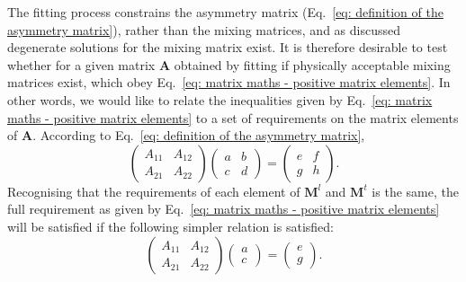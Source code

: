 The fitting process constrains the asymmetry matrix (Eq.~\eqref{eq: definition of the asymmetry matrix}), rather than the mixing matrices, and as discussed degenerate solutions for the mixing matrix exist. It is therefore desirable to test whether for a given matrix $\mathbf{A}$ obtained by fitting if physically acceptable mixing matrices exist, which obey Eq.~\eqref{eq: matrix maths - positive matrix elements}. In other words, we would like to relate the inequalities given by Eq.~\eqref{eq: matrix maths - positive matrix elements} to a set of requirements on the matrix elements of $\mathbf{A}$. According to Eq.~\eqref{eq: definition of the asymmetry matrix},
\begin{equation}
    \label{eq: constraints on the asymmetry matrix}
    \begin{pmatrix} A_{11}&A_{12}\\A_{21}&A_{22}\end{pmatrix}\begin{pmatrix} a&b\\c&d\end{pmatrix} = \begin{pmatrix} e&f\\g&h\end{pmatrix}.
\end{equation}
Recognising that the requirements of each element of $\mathbf{M}^l$ and $\mathbf{M}^t$ is the same, the full requirement as given by Eq.~\eqref{eq: matrix maths - positive matrix elements} will be satisfied if the following simpler relation is satisfied:
\begin{equation}
    \label{eq: simpler constraints on the asymmetry matrix}
    \begin{pmatrix} A_{11}&A_{12}\\A_{21}&A_{22}\end{pmatrix}\begin{pmatrix} a\\c\end{pmatrix} = \begin{pmatrix} e\\g\end{pmatrix}.
\end{equation}


